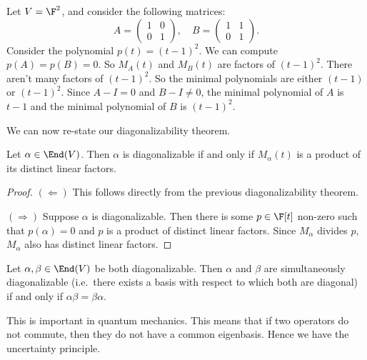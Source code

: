 \documentclass[a4paper]{article}
\begin{document}
\begin{eg}
  Let $V = \F^2$, and consider the following matrices:
  \[
    A =
    \begin{pmatrix}
      1 & 0\\
      0 & 1
    \end{pmatrix},\quad
    B =
    \begin{pmatrix}
      1 & 1\\
      0 & 1
    \end{pmatrix}.
  \]
  Consider the polynomial $p(t) = (t - 1)^2$. We can compute $p(A) = p(B) = 0$. So $M_A(t)$ and $M_B(t)$ are factors of $(t - 1)^2$. There aren't many factors of $(t - 1)^2$. So the minimal polynomials are either $(t - 1)$ or $(t - 1)^2$. Since $A - I = 0$ and $B - I \not= 0$, the minimal polynomial of $A$ is $t - 1$ and the minimal polynomial of $B$ is $(t - 1)^2$.
\end{eg}

We can now re-state our diagonalizability theorem.
\begin{thm}
  Let $\alpha \in \End(V)$. Then $\alpha$ is diagonalizable if and only if $M_\alpha(t)$ is a product of its distinct linear factors.
\end{thm}

\begin{proof}
  $(\Leftarrow)$ This follows directly from the previous diagonalizability theorem.

  $(\Rightarrow)$ Suppose $\alpha$ is diagonalizable. Then there is some $p\in \F[t]$ non-zero such that $p(\alpha) = 0$ and $p$ is a product of distinct linear factors. Since $M_\alpha$ divides $p$, $M_\alpha$ also has distinct linear factors.
\end{proof}

\begin{thm}
  Let $\alpha, \beta \in \End(V)$ be both diagonalizable. Then $\alpha$ and $\beta$ are simultaneously diagonalizable (i.e.\ there exists a basis with respect to which both are diagonal) if and only if $\alpha\beta = \beta\alpha$.
\end{thm}
This is important in quantum mechanics. This means that if two operators do not commute, then they do not have a common eigenbasis. Hence we have the uncertainty principle.
\end{document}
